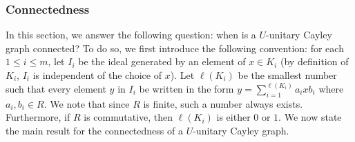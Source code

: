 \documentclass[12pt, a4paper]{amsart}
\theoremstyle{definition}
\numberwithin{equation}{section}
\begin{document}
\subsubsection{Connectedness}
In this section, we answer the following question: when is a $U$-unitary Cayley graph connected? To do so,  we first introduce the following convention: for each $1 \leq i \leq m$, let $I_i$ be the ideal generated by an element of $ x \in K_i$ (by definition of $K_i$, $I_i$ is independent of the choice of $x$). Let $\ell(K_i)$ be the smallest number such that every element $y$ in $I_i$ be written in the form $y = \sum_{i=1}^{\ell(K_i)} a_{i} x b_i$ where $a_i, b_i \in R$. We note that since $R$ is finite, such a number always exists. Furthermore, if $R$ is commutative, then $\ell(K_i)$ is either $0$ or $1.$  We now state the main result for the connectedness of a $U$-unitary Cayley graph.
\end{document}
